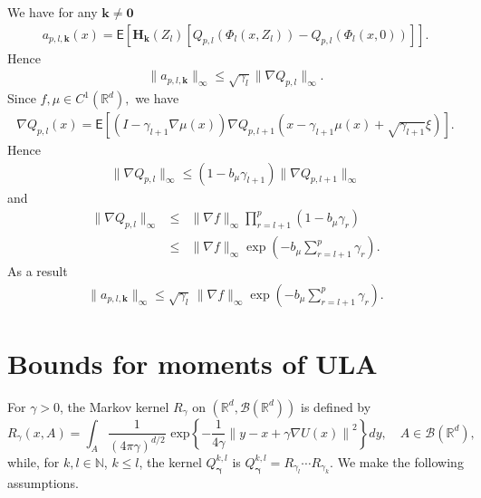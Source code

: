 \documentclass[bj]{imsart}
\begin{document}
We have for any \(\mathbf{k}\neq \mathbf{0}\)
\begin{eqnarray*}
a_{p,l,\mathbf{k}}(x)=\mathsf{E}\left[\mathbf{H}_\mathbf{k}\left(Z_l\right)[Q_{p,l}\left(\Phi_l(x,Z_l)\right)-Q_{p,l}\left(\Phi_l(x,0)\right)]\right].
\end{eqnarray*}
Hence
\begin{eqnarray*}
\|a_{p,l,\mathbf{k}}\|_{\infty}\leq \sqrt{\gamma_l}\|\nabla Q_{p,l}\|_{\infty}.
\end{eqnarray*}
Since \(f,\mu\in C^1(\mathbb{R}^d),\)  we have
\begin{eqnarray*}
\nabla Q_{p,l}(x)=\mathsf{E}\left[(I-\gamma_{l+1}\nabla\mu(x))\nabla Q_{p,l+1}(x-\gamma_{l+1}\mu(x)+\sqrt{\gamma_{l+1}}\xi)\right].
\end{eqnarray*}
Hence
\begin{eqnarray*}
\|\nabla Q_{p,l}\|_\infty\leq (1-b_{\mu}\gamma_{l+1})\|\nabla Q_{p,l+1}\|_\infty
\end{eqnarray*}
and
\begin{eqnarray*}
\|\nabla Q_{p,l}\|_\infty&\leq & \|\nabla f\|_\infty\prod_{r=l+1}^p (1-b_{\mu}\gamma_{r})
\\
&\leq & \|\nabla f\|_\infty\exp\left(-b_{\mu}\sum_{r=l+1}^p \gamma_{r}  \right).
\end{eqnarray*}
As a result
\begin{eqnarray*}
\|a_{p,l,\mathbf{k}}\|_{\infty}\leq \sqrt{\gamma_l}\, \|\nabla f\|_\infty\exp\left(-b_{\mu}\sum_{r=l+1}^p \gamma_{r}  \right).
\end{eqnarray*}

\appendix

\section{Bounds for moments of  ULA}\label{sec:appendix}
For $\gamma>0$, the Markov kernel $R_\gamma$
on $(\mathbb R^d,\mathcal B(\mathbb R^d))$
is defined by
\begin{equation}
\label{eq:kernel}
R_\gamma(x,A)=\int_{A} \frac{1}{(4 \pi \gamma)^{d/2}} \text{ exp} \left\{ -\frac{1}{4\gamma} \left\| y - x + \gamma \nabla U(x)\right\|^2\right\}dy,\quad A\in \mathcal B(\mathbb R^d),
\end{equation}
while, for $k,l\in\mathbb N$, $k\le l$,
the kernel $Q_{\boldsymbol{\gamma}}^{k,l}$ is
$
Q_{\boldsymbol{\gamma}}^{k,l}=R_{\gamma_l}\cdots R_{\gamma_k}.
$
 We make the following assumptions. 
\end{document}
